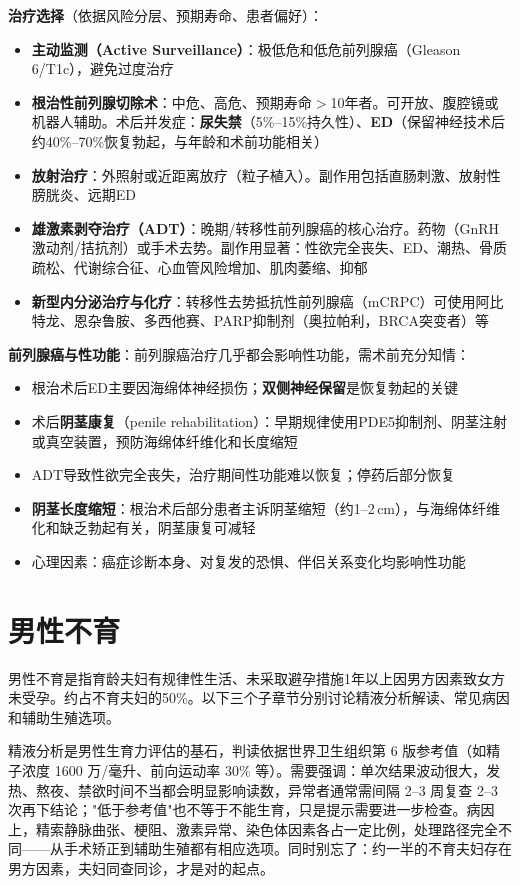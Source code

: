\textbf{治疗选择}（依据风险分层、预期寿命、患者偏好）：
\begin{itemize}[leftmargin=2cm]
	\item \textbf{主动监测（Active Surveillance）}：极低危和低危前列腺癌（Gleason 6/T1c），避免过度治疗
	\item \textbf{根治性前列腺切除术}：中危、高危、预期寿命$>$10年者。可开放、腹腔镜或机器人辅助。术后并发症：\textbf{尿失禁}（5\%--15\%持久性）、\textbf{ED}（保留神经技术后约40\%--70\%恢复勃起，与年龄和术前功能相关）
	\item \textbf{放射治疗}：外照射或近距离放疗（粒子植入）。副作用包括直肠刺激、放射性膀胱炎、远期ED
	\item \textbf{雄激素剥夺治疗（ADT）}：晚期/转移性前列腺癌的核心治疗。药物（GnRH激动剂/拮抗剂）或手术去势。副作用显著：性欲完全丧失、ED、潮热、骨质疏松、代谢综合征、心血管风险增加、肌肉萎缩、抑郁
	\item \textbf{新型内分泌治疗与化疗}：转移性去势抵抗性前列腺癌（mCRPC）可使用阿比特龙、恩杂鲁胺、多西他赛、PARP抑制剂（奥拉帕利，BRCA突变者）等
\end{itemize}

\textbf{前列腺癌与性功能}：前列腺癌治疗几乎都会影响性功能，需术前充分知情：
\begin{itemize}[leftmargin=2cm]
	\item 根治术后ED主要因海绵体神经损伤；\textbf{双侧神经保留}是恢复勃起的关键
	\item 术后\textbf{阴茎康复}（penile rehabilitation）：早期规律使用PDE5抑制剂、阴茎注射或真空装置，预防海绵体纤维化和长度缩短
	\item ADT导致性欲完全丧失，治疗期间性功能难以恢复；停药后部分恢复
	\item \textbf{阴茎长度缩短}：根治术后部分患者主诉阴茎缩短（约1--2\,cm），与海绵体纤维化和缺乏勃起有关，阴茎康复可减轻
	\item 心理因素：癌症诊断本身、对复发的恐惧、伴侣关系变化均影响性功能
\end{itemize}

\section{男性不育}

男性不育是指育龄夫妇有规律性生活、未采取避孕措施1年以上因男方因素致女方未受孕。约占不育夫妇的50\%。以下三个子章节分别讨论精液分析解读、常见病因和辅助生殖选项。


精液分析是男性生育力评估的基石，判读依据世界卫生组织第 6 版参考值（如精子浓度 1600 万/毫升、前向运动率 30\% 等）。需要强调：单次结果波动很大，发热、熬夜、禁欲时间不当都会明显影响读数，异常者通常需间隔 2--3 周复查 2--3 次再下结论；"低于参考值"也不等于不能生育，只是提示需要进一步检查。病因上，精索静脉曲张、梗阻、激素异常、染色体因素各占一定比例，处理路径完全不同——从手术矫正到辅助生殖都有相应选项。同时别忘了：约一半的不育夫妇存在男方因素，夫妇同查同诊，才是对的起点。

